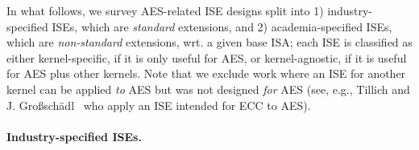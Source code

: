 
In what follows, we survey AES-related ISE designs split into
1) industry-specified ISEs,
   which are {\em     standard} extensions,
   and
2) academia-specified ISEs,
   which are {\em non-standard} extensions,
wrt. a given base ISA; each ISE is classified as either
   kernel-specific,
   if it is only useful for AES,
   or
   kernel-agnostic,
   if it is      useful for AES plus other kernels.
Note that we exclude work where an ISE for another kernel can be applied 
{\em  to} AES
but was not designed 
{\em for} AES
(see, e.g., Tillich and J. Gro{\ss}sch\"{a}dl~\cite{TilGro:04} who apply an ISE intended for ECC to AES).


\paragraph{Industry-specified ISEs.}

